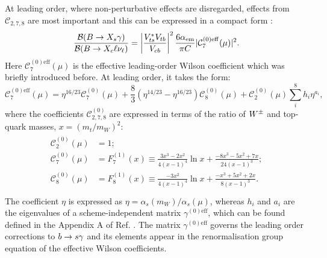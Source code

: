 At leading order, where non-perturbative effects are disregarded, effects from $\mathcal{C}_{2,7,8}$ are most important and this can be expressed in a compact form \cite{Buras:1993xp}:
\begin{equation}\label{eq:total_decay_rate_leading_order}
    \frac{\mathcal{B}(\BtoXsgamma)}{\mathcal{B}(\B\to X_c\ell\nu_\ell)} = \left|\frac{V_{ts}^*V_{tb}}{V_{cb}}\right|^2\frac{6\alpha_{\mathrm{em}}}{\pi C}|\mathcal{C}_{7}^{(0)\mathrm{eff}}(\mu)|^2.
\end{equation}
Here $\mathcal{C}_{7}^{(0)\mathrm{eff}}(\mu)$ is the effective leading-order Wilson coefficient which was briefly introduced before.
At leading order, it takes the form:
\begin{equation}\label{eq:effective_c7}
    \mathcal{C}_{7}^{(0)\mathrm{eff}}(\mu) = \eta^{16/23}\mathcal{C}^{(0)}_7(\mu) + \frac{8}{3} \left(\eta^{14/23}-\eta^{16/23}\right)\mathcal{C}^{(0)}_8(\mu) + \mathcal{C}^{(0)}_2(\mu) \sum_i^8h_i\eta^{a_i},
\end{equation}
where the \SM coefficients $\mathcal{C}_{2,7,8}^{(0)}$ are expressed in terms of the ratio of $W^\pm$ and top-quark masses, $x=(m_t/m_W)^2$:
\begin{align}\label{eq:leading_order_wilson_coeffs}
    \begin{split}
        \mathcal{C}_2^{(0)}(\mu) &= 1;\\
        \mathcal{C}_7^{(0)}(\mu) &= F_7^{(1)}(x) \equiv \frac{3x^3-2x^2}{4(x-1)^4}\ln x + \frac{-8x^3-5x^2+7x}{24(x-1)^3};\\
        \mathcal{C}_8^{(0)}(\mu) &= F_8^{(1)}(x) \equiv \frac{-3x^2}{4(x-1)^4}\ln x + \frac{-x^3+5x^2+2x}{8(x-1)^3}.\\
    \end{split}
\end{align}
The coefficient $\eta$ is expressed as $\eta=\alpha_s(m_W)/\alpha_s(\mu)$, whereas $h_i$ and $a_i$ are the eigenvalues of a scheme-independent matrix $\gamma^{(0)\mathrm{eff}}$, 
which can be found defined in the Appendix A of Ref. \cite{Buras:1993xp}.
The matrix $\gamma^{(0)\mathrm{eff}}$ governs the leading order \QCD corrections to $b\rightarrow s\gamma$ and its elements appear in the renormalisation group equation of the effective Wilson coefficients.

